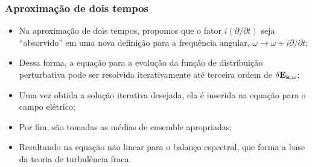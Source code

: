 \documentclass[10pt,aspectratio=1610,lualatex]{beamer}
\begin{document}
\begin{frame}
  \frametitle{Aproximação de dois tempos}
  \begin{itemize}
      \item Na aproximação de dois tempos, propomos que o fator
      $i(\partial/\partial t)$ seja ``absorvido'' em uma nova
      definição para a frequência angular, $\omega \rightarrow
      \omega+i \partial/\partial t$;
      \vspace{0.25cm}
      \pause
      \item Dessa forma, a equação para a evolução da função de
      distribuição perturbativa pode ser resolvida iterativamente
      até terceira ordem de $\delta {\bf E}_{{\bf k},\omega}$;
      \vspace{0.25cm}
      \pause
      \item Uma vez obtida a solução iterativa desejada, ela é
      inserida na equação para o campo elétrico;
      \vspace{0.25cm}
      \pause
      \item Por fim, são tomadas as médias de ensemble apropriadas;
      \vspace{0.25cm}
      \pause
      \item Resultando na equação não linear para o balanço espectral,
      que forma a base da teoria de turbulência fraca.
  \end{itemize}
\end{frame}
\end{document}
